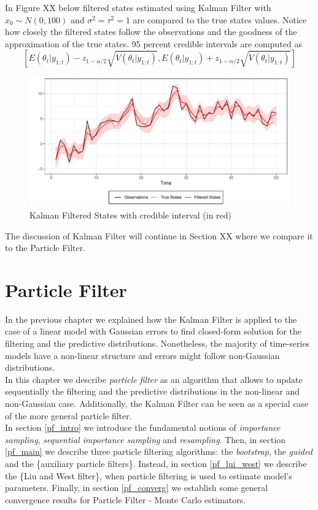 \documentclass[
]{book}
\theoremstyle{break}
\theoremstyle{nonumberplain}
\begin{document}
In Figure XX below filtered states estimated using Kalman Filter with
\(x_{0} \sim N(0,100)\) and \(\sigma^{2}=\tau^{2}=1\) are compared to
the true states values. Notice how closely the filtered states follow
the observations and the goodness of the approximation of the true
states. 95 percent credible intervals are computed as
\[[E(\theta_{t}|y_{1:t})-z_{1-\alpha/2}\sqrt{V(\theta_{t}|y_{1:t})},E(\theta_{t}|y_{1:t})+z_{1-\alpha/2}\sqrt{V(\theta_{t}|y_{1:t})}]\]

\begin{figure}[H]

{\centering \includegraphics{nuova-final-draft_files/figure-latex/unnamed-chunk-7-1} 

}

\caption{Kalman Filtered States with credible interval (in red)}\label{fig:unnamed-chunk-7}
\end{figure}

The discussion of Kalman Filter will continue in Section XX where we
compare it to the Particle Filter.

\chapter{Particle Filter}

In the previous chapter we explained how the Kalman Filter is applied to
the case of a linear model with Gaussian errors to find closed-form
solution for the filtering and the predictive distributions.
Nonetheless, the majority of time-series models have a non-linear
structure and errors might follow non-Gaussian distributions.\\
In this chapter we describe \textit{particle filter} as an algorithm
that allows to update sequentially the filtering and the predictive
distributions in the non-linear and non-Gaussian case. Additionally, the
Kalman Filter can be seen as a special case of the more general particle
filter.\\
In section \ref{pf_intro} we introduce the fundamental notions of
\textit{importance sampling}, \textit{sequential importance sampling}
and \textit{resampling}. Then, in section \ref{pf_main} we describe
three particle filtering algorithms: the \textit{bootstrap}, the
\textit{guided} and the \{auxiliary particle filters\}. Instead, in
section \ref{pf_lui_west} we describe the \{Liu and West filter\}, when
particle filtering is used to estimate model's parameters. Finally, in
section \ref{pf_converg} we establish some general convergence results
for Particle Filter - Monte Carlo estimators.
\end{document}
